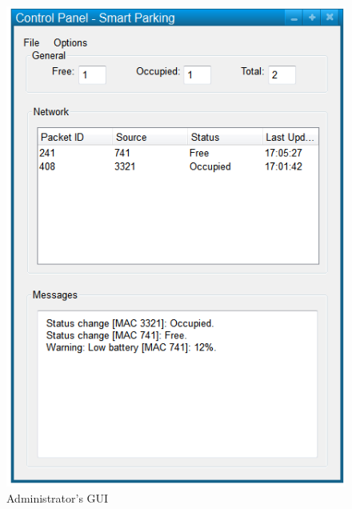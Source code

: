 \begin{figure}
    \centering
    \includegraphics[width=15cm]{images/General_ApplicationGUI.png}
	\vspace{-1.5em}
    \caption{Administrator's GUI}
    \vspace{-1.5em}
    \label{fig:gui}
\end{figure}


